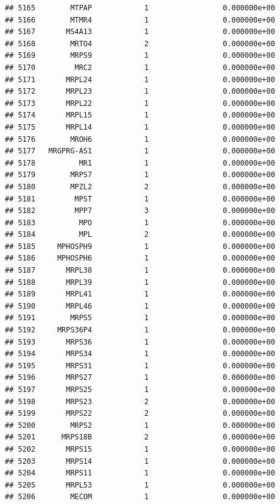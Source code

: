 \documentclass[
]{article}
\begin{document}
\begin{verbatim}
## 5165        MTPAP            1                 0.000000e+00
## 5166        MTMR4            1                 0.000000e+00
## 5167       MS4A13            1                 0.000000e+00
## 5168        MRTO4            2                 0.000000e+00
## 5169        MRPS9            1                 0.000000e+00
## 5170         MRC2            1                 0.000000e+00
## 5171       MRPL24            1                 0.000000e+00
## 5172       MRPL23            1                 0.000000e+00
## 5173       MRPL22            1                 0.000000e+00
## 5174       MRPL15            1                 0.000000e+00
## 5175       MRPL14            1                 0.000000e+00
## 5176        MROH6            1                 0.000000e+00
## 5177   MRGPRG-AS1            1                 0.000000e+00
## 5178          MR1            1                 0.000000e+00
## 5179        MRPS7            1                 0.000000e+00
## 5180        MPZL2            2                 0.000000e+00
## 5181         MPST            1                 0.000000e+00
## 5182         MPP7            3                 0.000000e+00
## 5183          MPO            1                 0.000000e+00
## 5184          MPL            2                 0.000000e+00
## 5185     MPHOSPH9            1                 0.000000e+00
## 5186     MPHOSPH6            1                 0.000000e+00
## 5187       MRPL38            1                 0.000000e+00
## 5188       MRPL39            1                 0.000000e+00
## 5189       MRPL41            1                 0.000000e+00
## 5190       MRPL46            1                 0.000000e+00
## 5191        MRPS5            1                 0.000000e+00
## 5192     MRPS36P4            1                 0.000000e+00
## 5193       MRPS36            1                 0.000000e+00
## 5194       MRPS34            1                 0.000000e+00
## 5195       MRPS31            1                 0.000000e+00
## 5196       MRPS27            1                 0.000000e+00
## 5197       MRPS25            1                 0.000000e+00
## 5198       MRPS23            2                 0.000000e+00
## 5199       MRPS22            2                 0.000000e+00
## 5200        MRPS2            1                 0.000000e+00
## 5201      MRPS18B            2                 0.000000e+00
## 5202       MRPS15            1                 0.000000e+00
## 5203       MRPS14            1                 0.000000e+00
## 5204       MRPS11            1                 0.000000e+00
## 5205       MRPL53            1                 0.000000e+00
## 5206        MECOM            1                 0.000000e+00

\end{verbatim}
\end{document}
